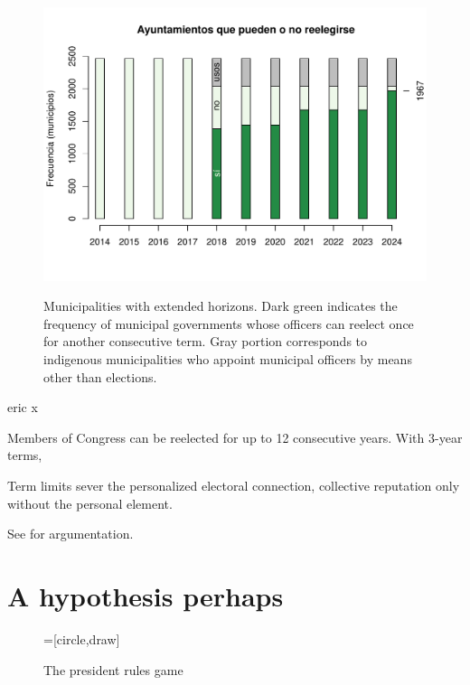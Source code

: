 \documentclass[letter,12pt]{article}
\begin{document}
\begin{figure}
  \centering
  \caption{Municipalities with extended horizons. Dark green indicates the frequency of municipal governments whose officers can reelect once for another consecutive term. Gray portion corresponds to indigenous municipalities who appoint municipal officers by means other than elections.}
  \includegraphics[width=.8\columnwidth]{../pics/ayuntamientos.pdf} \\
\end{figure}
eric  x

Members of Congress can be reelected for up to 12 consecutive years. With 3-year terms, 

Term limits sever the personalized electoral connection, collective reputation only without the personal element.

See \citet{cain.etal.1987} for argumentation.

\section{A hypothesis perhaps}

\begin{figure}
  \centering
    \caption{The president rules game}\label{F:game}
    =[circle,draw]
\end{figure}
\end{document}
